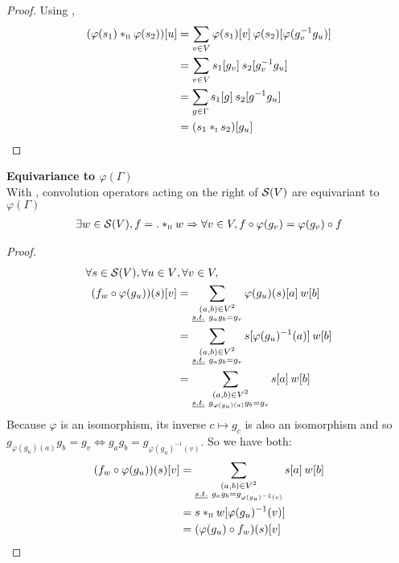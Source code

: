 \begin{proof}
Using ,
\begin{align*}
(\varphi(s_1) \ast_{\II} \varphi(s_2))[u] & = \displaystyle \sum_{v \in V} \varphi(s_1)[v] \h{2} \varphi(s_2)[\varphi(g_v^{-1}g_u)]\\
 & = \displaystyle \sum_{v \in V} s_1[g_v] \h{2} s_2[g_v^{-1}g_u]\\
 & = \displaystyle \sum_{g \in \Gamma} s_1[g] \h{2} s_2[g^{-1}g_u]\\
 & = (s_1 \ast_{\I} s_2)[g_u]
\end{align*}
\end{proof}

\begin{proposition}\textbf{Equivariance to $\varphi(\Gamma)$}\\
With , convolution operators acting on the right of $\cs(V)$ are equivariant to $\varphi(\Gamma)$ \ie
\begin{gather*}
\exists w \in \cs(V), f = . \ast_{\II} w \Rightarrow \forall v \in V, f \circ \varphi(g_v) = \varphi(g_v) \circ f
\end{gather*}
\label{prop:equiV}
\end{proposition}

\begin{proof}
\begin{align*}
\forall s \in \cs(V), \forall u \in V & ,\forall v \in V,\\
(f_w \circ \varphi(g_u)) (s) [v] & = \sum_{\substack{(a,b) \in V^2 \\ \st g_ag_b=g_v }} \varphi(g_u)(s)[a] \h{2} w[b]\\
& = \sum_{\substack{(a,b) \in V^2 \\ \st g_ag_b=g_v }} s[\varphi(g_u)^{-1}(a)] \h{2} w[b]\\
& = \sum_{\substack{(a,b) \in V^2 \\ \st g_{\varphi(g_u)(a)}g_b=g_v }} s[a] \h{2} w[b]\\
\end{align*}
Because $\varphi$ is an isomorphism, its inverse $c \mapsto g_c$ is also an isomorphism and so $g_{\varphi(g_u)(a)}g_b=g_v \Leftrightarrow g_{a}g_b=g_{\varphi(g_u)^{-1}(v)}$. So we have both:
\begin{align*}
(f_w \circ \varphi(g_u)) (s) [v] & = \sum_{\substack{(a,b) \in V^2 \\ \st g_{a}g_b=g_{\varphi(g_u)^{-1}(v)} }} s[a] \h{2} w[b]\\
& = s \ast_{\II} w [\varphi(g_u)^{-1}(v)]\\
& = (\varphi(g_u) \circ f_w) (s) [v]
\end{align*}
\end{proof}

